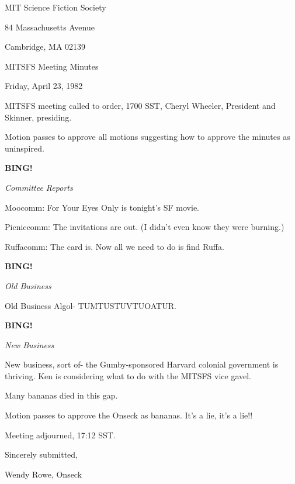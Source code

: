 \documentclass[12pt]{article}
\newcommand{\bing}{{\bf BING!} }
\newcommand{\goto}[1]{\bing \vskip 12pt \centerline{{\em{#1}}}}
\begin{document}
\begin{center}

MIT Science Fiction Society 

84 Massachusetts Avenue

Cambridge, MA 02139

\vspace{12pt}

MITSFS Meeting Minutes 

Friday, April 23, 1982

\end{center}
 
\vspace{18pt}

\setlength{\parskip}{6pt}

\noindent
MITSFS meeting called to order, 1700 SST,
Cheryl Wheeler, President and Skinner, presiding.

Motion passes to approve all motions suggesting how to approve the minutes as uninspired.

\goto{Committee Reports}

Moocomm: For Your Eyes Only is tonight's SF movie.

Picniccomm: The invitations are out. (I didn't even know they were burning.)

Ruffacomm: The card is. Now all we need to do is find Ruffa.

\goto{Old Business}

Old Business Algol- TUMTUSTUVTUOATUR.

\goto{New Business}

New business, sort of- the Gumby-sponsored Harvard colonial government is thriving. Ken is considering what to do with the MITSFS vice gavel.

Many bananas died in this gap.

Motion passes to approve the Onseck as bananas. It's a lie, it's a lie!!

\vspace{12pt}

\noindent
Meeting adjourned, 17:12 SST.

\vspace{18pt}

\centerline{Sincerely submitted,}
\centerline{Wendy Rowe, Onseck}
\end{document}

